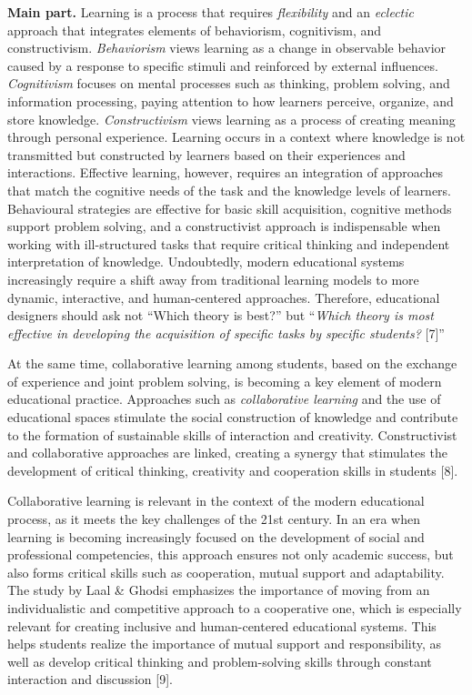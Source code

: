\begin{multicols}{2}
{\bfseries Main part.} Learning is a process that requires
\emph{flexibility} and an \emph{eclectic} approach that integrates
elements of behaviorism, cognitivism, and constructivism.
\emph{Behaviorism} views learning as a change in observable behavior
caused by a response to specific stimuli and reinforced by external
influences. \emph{Cognitivism} focuses on mental processes such as
thinking, problem solving, and information processing, paying attention
to how learners perceive, organize, and store knowledge.
\emph{Constructivism} views learning as a process of creating meaning
through personal experience. Learning occurs in a context where
knowledge is not transmitted but constructed by learners based on their
experiences and interactions. Effective learning, however, requires an
integration of approaches that match the cognitive needs of the task and
the knowledge levels of learners. Behavioural strategies are effective
for basic skill acquisition, cognitive methods support problem solving,
and a constructivist approach is indispensable when working with
ill-structured tasks that require critical thinking and independent
interpretation of knowledge. Undoubtedly, modern educational systems
increasingly require a shift away from traditional learning models to
more dynamic, interactive, and human-centered approaches. Therefore,
educational designers should ask not ``Which theory is best?'' but
``\emph{Which theory is most effective in developing the acquisition of
specific tasks by specific students?} {[}7{]}''

At the same time, collaborative learning among students, based on the
exchange of experience and joint problem solving, is becoming a key
element of modern educational practice. Approaches such as
\emph{collaborative learning} and the use of educational spaces
stimulate the social construction of knowledge and contribute to the
formation of sustainable skills of interaction and creativity.
Constructivist and collaborative approaches are linked, creating a
synergy that stimulates the development of critical thinking, creativity
and cooperation skills in students {[}8{]}.

Collaborative learning is relevant in the context of the modern
educational process, as it meets the key challenges of the 21st century.
In an era when learning is becoming increasingly focused on the
development of social and professional competencies, this approach
ensures not only academic success, but also forms critical skills such
as cooperation, mutual support and adaptability. The study by Laal \&
Ghodsi emphasizes the importance of moving from an individualistic and
competitive approach to a cooperative one, which is especially relevant
for creating inclusive and human-centered educational systems. This
helps students realize the importance of mutual support and
responsibility, as well as develop critical thinking and problem-solving
skills through constant interaction and discussion {[}9{]}.


\end{multicols}
